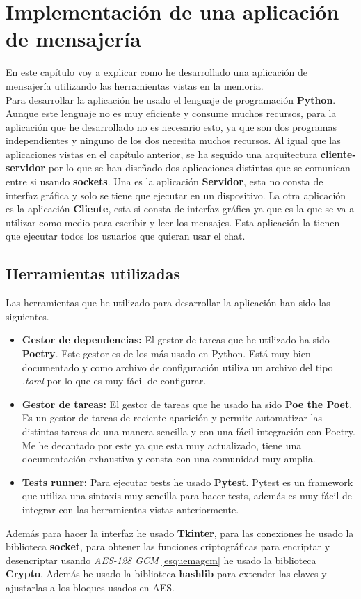 \chapter{Implementación de una aplicación de mensajería}
\label{chap:ocho}

En este capítulo voy a explicar como he desarrollado una aplicación de mensajería utilizando las herramientas vistas en la memoria.\\
Para desarrollar la aplicación he usado el lenguaje de programación \textbf{Python}. Aunque este lenguaje no es muy eficiente y consume muchos recursos, para la aplicación que he desarrollado no es necesario esto, ya que son dos programas independientes y ninguno de los dos necesita muchos recursos. Al igual que las aplicaciones vistas en el capítulo anterior, se ha seguido una arquitectura \textbf{cliente-servidor} por lo que se han diseñado dos aplicaciones distintas que se comunican entre si usando \textbf{sockets}. Una es la aplicación \textbf{Servidor}, esta no consta de interfaz gráfica y solo se tiene que ejecutar en un dispositivo. La otra aplicación es la aplicación \textbf{Cliente}, esta si consta de interfaz gráfica ya que es la que se va a utilizar como medio para escribir y leer los mensajes. Esta aplicación la tienen que ejecutar todos los usuarios que quieran usar el chat.

\section{Herramientas utilizadas}
Las herramientas que he utilizado para desarrollar la aplicación han sido las siguientes.
\begin{itemize}
	\item \textbf{Gestor de dependencias:} El gestor de tareas que he utilizado ha sido \textbf{Poetry}. Este gestor es de los más usado en Python. Está muy bien documentado y como archivo de configuración utiliza un archivo del tipo \emph{.toml} por lo que es muy fácil de configurar. 
	\item \textbf{Gestor de tareas:} El gestor de tareas que he usado ha sido \textbf{Poe the Poet}. Es un gestor de tareas de reciente aparición y permite automatizar las distintas tareas de una manera sencilla y con una fácil integración con Poetry. Me he decantado por este ya que esta muy actualizado, tiene una documentación exhaustiva y consta con una comunidad muy amplia.
	\item \textbf{Tests runner:} Para ejecutar tests he usado \textbf{Pytest}. Pytest es un framework que utiliza una sintaxis muy sencilla para hacer tests, además es muy fácil de integrar con las herramientas vistas anteriormente.
\end{itemize}
Además para hacer la interfaz he usado \textbf{Tkinter}, para las conexiones he usado la biblioteca \textbf{socket}, para obtener las funciones criptográficas para encriptar y desencriptar usando \emph{AES-128 GCM} \ref{esquemagcm} he usado la biblioteca \textbf{Crypto}. Además he usado la biblioteca \textbf{hashlib} para extender las claves y ajustarlas a los bloques usados en AES.

